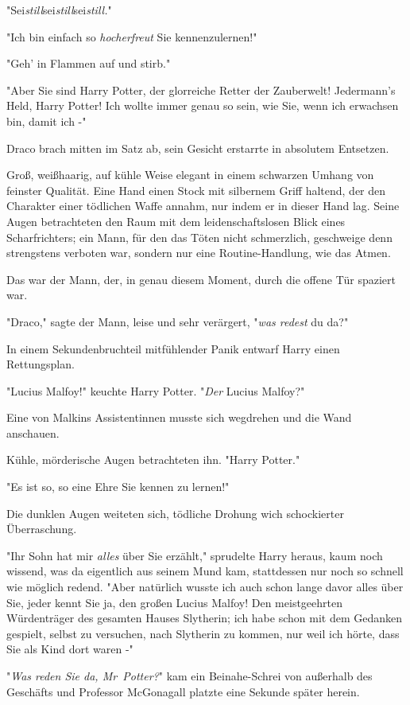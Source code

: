 {"Sei\emph{still}sei\emph{still}sei\emph{still.}"

"Ich bin einfach so \emph{hocherfreut} Sie kennenzulernen!"

"Geh' in Flammen auf und stirb."

"Aber Sie sind Harry Potter, der glorreiche Retter der Zauberwelt! Jedermann's Held, Harry Potter! Ich wollte immer genau so sein, wie Sie, wenn ich erwachsen bin, damit ich -"

Draco brach mitten im Satz ab, sein Gesicht erstarrte in absolutem Entsetzen.

Groß, weißhaarig, auf kühle Weise elegant in einem schwarzen Umhang von feinster Qualität. Eine Hand einen Stock mit silbernem Griff haltend, der den Charakter einer tödlichen Waffe annahm, nur indem er in dieser Hand lag. Seine Augen betrachteten den Raum mit dem leidenschaftslosen Blick eines Scharfrichters; ein Mann, für den das Töten nicht schmerzlich, geschweige denn strengstens verboten war, sondern nur eine Routine-Handlung, wie das Atmen.

Das war der Mann, der, in genau diesem Moment, durch die offene Tür spaziert war.

"Draco," sagte der Mann, leise und sehr verärgert, "\emph{was redest} du da?"

In einem Sekundenbruchteil mitfühlender Panik entwarf Harry einen Rettungsplan.

"Lucius Malfoy!" keuchte Harry Potter. "\emph{Der} Lucius Malfoy?"

Eine von Malkins Assistentinnen musste sich wegdrehen und die Wand anschauen.

Kühle, mörderische Augen betrachteten ihn. "Harry Potter."

"Es ist so, so eine Ehre Sie kennen zu lernen!"

Die dunklen Augen weiteten sich, tödliche Drohung wich schockierter Überraschung.

"Ihr Sohn hat mir \emph{alles} über Sie erzählt," sprudelte Harry heraus, kaum noch wissend, was da eigentlich aus seinem Mund kam, stattdessen nur noch so schnell wie möglich redend. "Aber natürlich wusste ich auch schon lange davor alles über Sie, jeder kennt Sie ja, den großen Lucius Malfoy! Den meistgeehrten Würdenträger des gesamten Hauses Slytherin; ich habe schon mit dem Gedanken gespielt, selbst zu versuchen, nach Slytherin zu kommen, nur weil ich hörte, dass Sie als Kind dort waren -"

"\emph{Was reden Sie da, Mr~Potter?}" kam ein Beinahe-Schrei von außerhalb des Geschäfts und Professor McGonagall platzte eine Sekunde später herein.

}
